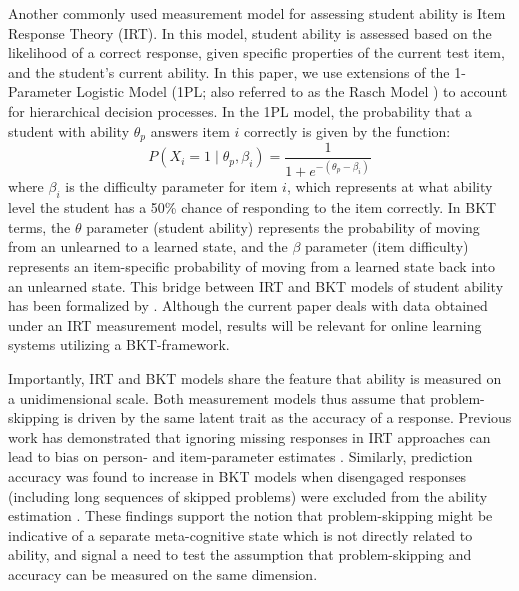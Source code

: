 \documentclass[12pt]{article}
\begin{document}
Another commonly used measurement model for assessing student ability is Item Response Theory (IRT). In this model, student ability is assessed based on the likelihood of a correct response, given specific properties of the current test item, and the student's current ability. In this paper, we use extensions of the 1-Parameter Logistic Model (1PL; also referred to as the Rasch Model \parencite{rasch1993probabilistic}) to account for hierarchical decision processes. In the 1PL model, the probability that a student with ability $\theta_p$ answers item $i$ correctly is given by the function: 
\begin{equation}
  P(X_i = 1 \mid \theta_p, \beta_i) = \frac{1}{1 + e^{-(\theta_p - \beta_i)}}
  \label{eq:Rasch}
\end{equation}
where $\beta_i$ is the difficulty parameter for item $i$, which represents at what ability level the student has a 50\% chance of responding to the item correctly. In BKT terms, the $\theta$ parameter (student ability) represents the probability of moving from an unlearned to a learned state, and the $\beta$ parameter (item difficulty) represents an item-specific probability of moving from a learned state back into an unlearned state. This bridge between IRT and BKT models of student ability has been formalized by \parencite{deonovic2018learning}. Although the current paper deals with data obtained under an IRT measurement model, results will be relevant for online learning systems utilizing a BKT-framework. 

Importantly, IRT and BKT models share the feature that ability is measured on a unidimensional scale. Both measurement models thus assume that problem-skipping is driven by the same latent trait as the accuracy of a response. Previous work has demonstrated that ignoring missing responses in IRT approaches can lead to bias on person- and item-parameter estimates \parencite{finch2008estimation, mislevy1996missing, pohl2014dealing, holman2005modelling, debeer2017modeling}. Similarly, prediction accuracy was found to increase in BKT models when disengaged responses (including long sequences of skipped problems) were excluded from the ability estimation \parencite{gorgun2022considering}. These findings support the notion that problem-skipping might be indicative of a separate meta-cognitive state which is not directly related to ability, and signal a need to test the assumption that problem-skipping and accuracy can be measured on the same dimension. 

\vspace*{2em} %
\end{document}
